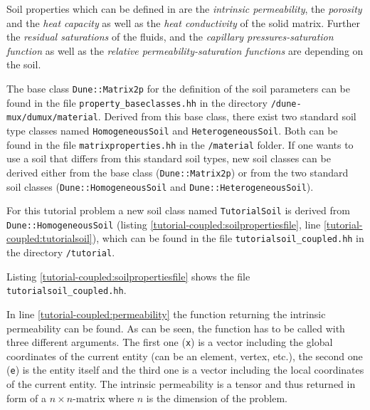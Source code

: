 Soil properties which can be defined in \Dumux are the \textit{intrinsic permeability}, the \textit{porosity} and the \textit{heat capacity} as well as the \textit{heat conductivity} of the solid matrix. Further the \textit{residual saturations} of the fluids, and the \textit{capillary pressures-saturation function} as well as the \textit{relative permeability-saturation functions} are depending on the soil.

The base class \texttt{Dune::Matrix2p} for the definition of the soil parameters can be found in the file \texttt{property\_baseclasses.hh} in the directory \texttt{/dune-mux/dumux/material}. Derived from this base class, there exist two standard soil type classes named \texttt{HomogeneousSoil} and \texttt{HeterogeneousSoil}. Both can be found in the file \texttt{matrixproperties.hh} in the \texttt{/material} folder. If one wants to use a soil that differs from this standard soil types, new soil classes can be derived either from the base class (\texttt{Dune::Matrix2p}) or from the two standard soil classes (\texttt{Dune::HomogeneousSoil} and \texttt{Dune::HeterogeneousSoil}).

For this tutorial problem a new soil class named \texttt{TutorialSoil} is derived from \texttt{Dune::HomogeneousSoil} (listing \ref{tutorial-coupled:soilpropertiesfile}, line \ref{tutorial-coupled:tutorialsoil}), which can be found in the file \texttt{tutorialsoil\_coupled.hh} in the directory \texttt{/tutorial}.

Listing \ref{tutorial-coupled:soilpropertiesfile} shows the file \texttt{tutorialsoil\_coupled.hh}.

\begin{lst}\label{tutorial-coupled:soilpropertiesfile} \mbox{}

\end{lst}

In line \ref{tutorial-coupled:permeability} the function returning the intrinsic permeability can be found. As can be seen, the function has to be called with three different arguments. The first one (\texttt{x}) is a vector including the global coordinates of the current entity (can be an element, vertex, etc.), the second one (\texttt{e}) is the entity itself and the third one is a vector including the local coordinates of the current entity. The intrinsic permeability is a tensor and thus returned in form of a $n \times n$-matrix where $n$ is the dimension of the problem.

